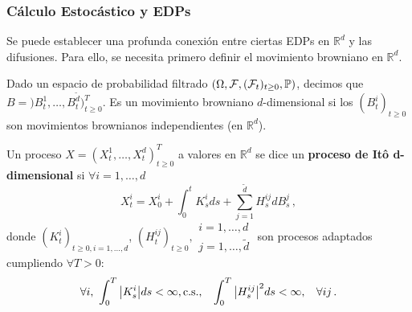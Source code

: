 \subsubsection{Cálculo Estocástico y EDPs}
Se puede establecer una profunda conexión entre ciertas EDPs en $\mathbb{R}^{d}$ y las difusiones. Para ello, se necesita primero definir el movimiento browniano en $\mathbb{R}^d$. 
\begin{definition}
Dado un espacio de probabilidad filtrado $(\Omega, \mathcal{F},(\mathcal{F}_t)_{t \geq 0}, \P)$, decimos que $B = )B_t^1, \ldots, B_t^{\tilde{d}})_{t \ge 0}^{T}$. Es un movimiento browniano $d$-dimensional si los $(B_t^i)_{t\ge 0}$ son movimientos brownianos independientes (en $\mathbb{R}^d$). 
\end{definition}

\begin{definition}
Un proceso $X = (X_t^1, \ldots, X_t^d)_{t \ge 0}^T$ a valores en $\mathbb{R}^d$ se dice un \textbf{proceso de It\^{o} d-dimensional} si $\forall i = 1, \ldots, d$ 
\begin{equation*}
    \label{eq:sde_6}
    \tag{*}
    X_t^i = X_0^i + \int_{0}^{t} K_s^i ds + \sum_{j=1}^{\tilde{d}} H_s^{ij} dB_s^j \,,
\end{equation*}
donde $(K_{t}^{i})_{t \ge 0, i=1,\ldots,d}$, $(H^{ij}_{t})_{t \ge  0}, \substack{i =1, \ldots,d \\ j =1, \ldots,\tilde{d}}$ son procesos adaptados cumpliendo $\forall T > 0$: 
\begin{equation*}
    \forall i, ~ \int_{0}^{T} \abs{K_s^i} ds < \infty, \text{c.s.}, \espacio \int_{0}^{T} \abs{H^{ij}_s}^2 ds < \infty, \espacio \forall ij \,.
\end{equation*}
\end{definition}

